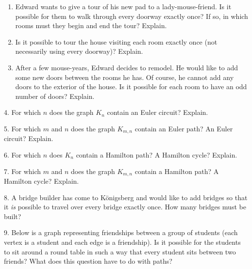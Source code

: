 \documentclass[10pt,]{book}
\theoremstyle{plain}
\theoremstyle{definition}
\theoremstyle{definition}
\theoremstyle{definition}
\theoremstyle{definition}
\numberwithin{equation}{chapter}
\begin{document}
\begin{exerciselist}
\par
\hypertarget{p-1669}{}%
\leavevmode%
\begin{enumerate}[label=(\alph*)]
\item\hypertarget{li-745}{}\hypertarget{p-1670}{}%
Edward wants to give a tour of his new pad to a lady-mouse-friend. Is it possible for them to walk through every doorway exactly once? If so, in which rooms must they begin and end the tour? Explain. %
\item\hypertarget{li-746}{}\hypertarget{p-1671}{}%
Is it possible to tour the house visiting each room exactly once (not necessarily using every doorway)? Explain. %
\item\hypertarget{li-747}{}\hypertarget{p-1672}{}%
After a few mouse-years, Edward decides to remodel. He would like to add some new doors between the rooms he has. Of course, he cannot add any doors to the exterior of the house. Is it possible for each room to have an odd number of doors? Explain. %
\end{enumerate}
%
\par\smallskip
\item[4.]\hypertarget{exercise-192}{}\hypertarget{p-1673}{}%
For which \(n\) does the graph \(K_n\) contain an Euler circuit? Explain.%
\par\smallskip
\item[5.]\hypertarget{exercise-193}{}\hypertarget{p-1675}{}%
For which \(m\) and \(n\) does the graph \(K_{m,n}\) contain an Euler path? An Euler circuit? Explain.%
\par\smallskip
\item[6.]\hypertarget{exercise-194}{}\hypertarget{p-1677}{}%
For which \(n\) does \(K_n\) contain a Hamilton path? A Hamilton cycle? Explain.%
\par\smallskip
\item[7.]\hypertarget{exercise-195}{}\hypertarget{p-1679}{}%
For which \(m\) and \(n\) does the graph \(K_{m,n}\) contain a Hamilton path? A Hamilton cycle? Explain.%
\par\smallskip
\item[8.]\hypertarget{exercise-196}{}\hypertarget{p-1681}{}%
A bridge builder has come to Königsberg and would like to add bridges so that it \emph{is} possible to travel over every bridge exactly once. How many bridges must be built?%
\par\smallskip
\item[9.]\hypertarget{exercise-197}{}\hypertarget{p-1683}{}%
Below is a graph representing friendships between a group of students (each vertex is a student and each edge is a friendship). Is it possible for the students to sit around a round table in such a way that every student sits between two friends? What does this question have to do with paths?%

\end{exerciselist}
\end{document}
